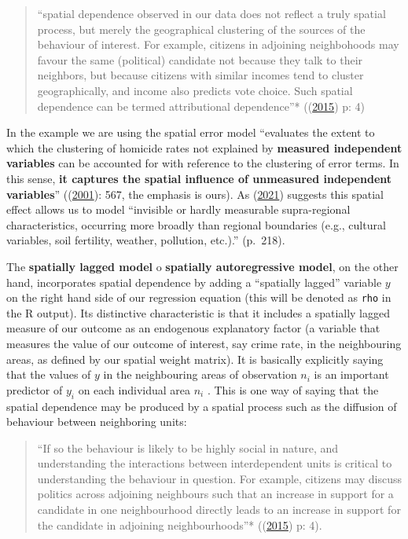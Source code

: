\documentclass[
  krantz2]{krantz}
\begin{document}
\begin{quote}
``spatial dependence observed in our data does not reflect a truly spatial process, but merely the geographical clustering of the sources of the behaviour of interest. For example, citizens in adjoining neighbohoods may favour the same (political) candidate not because they talk to their neighbors, but because citizens with similar incomes tend to cluster geographically, and income also predicts vote choice. Such spatial dependence can be termed attributional dependence''* ((\protect\hyperlink{ref-Darmofal_2015}{2015}) p: 4)
\end{quote}

In the example we are using the spatial error model ``evaluates the extent to which the clustering of homicide rates not explained by \textbf{measured independent variables} can be accounted for with reference to the clustering of error terms. In this sense, \textbf{it captures the spatial influence of unmeasured independent variables}'' ((\protect\hyperlink{ref-Baller_2001}{2001}): 567, the emphasis is ours). As (\protect\hyperlink{ref-Kopczewska_2021}{2021}) suggests this spatial effect allows us to model ``invisible or hardly measurable supra-regional characteristics, occurring more broadly than regional boundaries (e.g., cultural variables, soil fertility, weather, pollution, etc.).'' (p.~218).

The \textbf{spatially lagged model} o \textbf{spatially autoregressive model}, on the other hand, incorporates spatial dependence by adding a ``spatially lagged'' variable \(y\) on the right hand side of our regression equation (this will be denoted as \texttt{rho} in the R output). Its distinctive characteristic is that it includes a spatially lagged measure of our outcome as an endogenous explanatory factor (a variable that measures the value of our outcome of interest, say crime rate, in the neighbouring areas, as defined by our spatial weight matrix). It is basically explicitly saying that the values of \(y\) in the neighbouring areas of observation \(n_i\) is an important predictor of \(y_i\) on each individual area \(n_i\) . This is one way of saying that the spatial dependence may be produced by a spatial process such as the diffusion of behaviour between neighboring units:

\begin{quote}
``If so the behaviour is likely to be highly social in nature, and understanding the interactions between interdependent units is critical to understanding the behaviour in question. For example, citizens may discuss politics across adjoining neighbours such that an increase in support for a candidate in one neighbourhood directly leads to an increase in support for the candidate in adjoining neighbourhoods''* ((\protect\hyperlink{ref-Darmofal_2015}{2015}) p: 4).
\end{quote}
\end{document}
